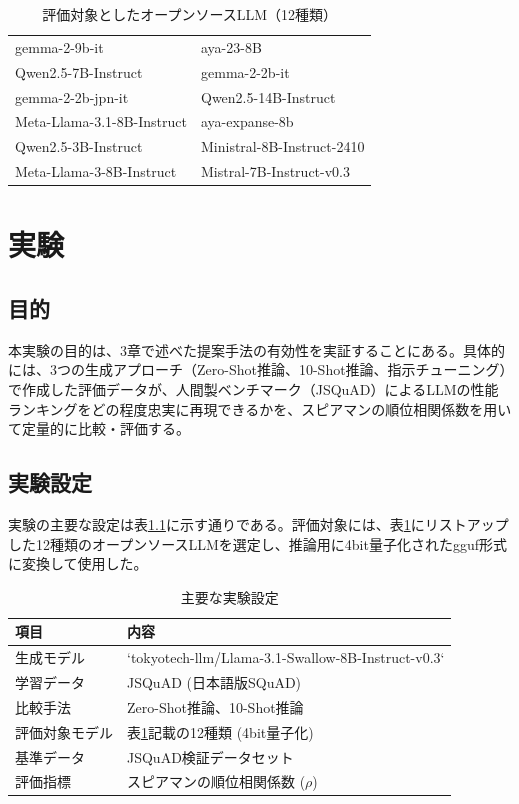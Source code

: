 \documentclass[a4paper,11pt]{jreport}
\begin{document}
\begin{table}[t]
  \centering
  \caption{評価対象としたオープンソースLLM（12種類）}
  \label{tab:target_llms}
  \begin{tabular}{|l|l|}
    \hline
    gemma-2-9b-it & aya-23-8B \\
    Qwen2.5-7B-Instruct & gemma-2-2b-it \\
    gemma-2-2b-jpn-it & Qwen2.5-14B-Instruct \\
    Meta-Llama-3.1-8B-Instruct & aya-expanse-8b \\
    Qwen2.5-3B-Instruct & Ministral-8B-Instruct-2410 \\
    Meta-Llama-3-8B-Instruct & Mistral-7B-Instruct-v0.3 \\
    \hline
  \end{tabular}
\end{table}


\chapter{実験}

\section{目的}
本実験の目的は、3章で述べた提案手法の有効性を実証することにある。具体的には、3つの生成アプローチ（Zero-Shot推論、10-Shot推論、指示チューニング）で作成した評価データが、人間製ベンチマーク（JSQuAD）によるLLMの性能ランキングをどの程度忠実に再現できるかを、スピアマンの順位相関係数を用いて定量的に比較・評価する。

\section{実験設定}
実験の主要な設定は表\ref{tab:exp_setting_main}に示す通りである。評価対象には、表\ref{tab:target_llms}にリストアップした12種類のオープンソースLLMを選定し、推論用に4bit量子化されたgguf形式に変換して使用した。

\begin{table}[h]
  \centering
  \caption{主要な実験設定}
  \label{tab:exp_setting_main}
  \begin{tabularx}{0.9\linewidth}{lX}
  \hline
  項目       & 内容 \\
  \hline
  生成モデル   & `tokyotech-llm/Llama-3.1-Swallow-8B-Instruct-v0.3` \\
  学習データ   & JSQuAD (日本語版SQuAD) \\
  比較手法   & Zero-Shot推論、10-Shot推論 \\
  評価対象モデル & 表\ref{tab:target_llms}記載の12種類 (4bit量子化) \\
  基準データ   & JSQuAD検証データセット \\
  評価指標     & スピアマンの順位相関係数 ($\rho$) \\
  \hline
  \end{tabularx}
\end{table}
\end{document}
